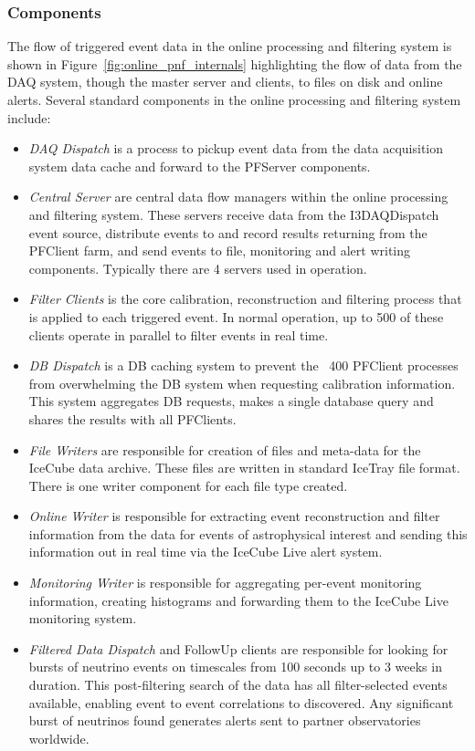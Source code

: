 \subsubsection{Components}
The flow of triggered event data in the online processing and filtering system is shown in Figure~\ref{fig:online_pnf_internals}
highlighting the flow of data from the DAQ system, though the master server and clients, to files on disk and
online alerts.  Several standard components in the online processing and filtering system include:
\begin{itemize}
\item \emph {DAQ Dispatch} is a process to pickup event data from the data acquisition system data cache and forward to
the PFServer components.
\item \emph {Central Server} are central data flow managers within the  online processing and filtering system.  These servers 
receive data from the I3DAQDispatch event source, distribute events to and record results returning from the PFClient farm,
and send events to file, monitoring and alert writing components.  Typically there are 4 servers used
in operation.
\item \emph {Filter Clients} is the core calibration, reconstruction and filtering process that is applied to each triggered event.  
In normal operation, up to 500 of these clients operate in parallel to filter events in real time.
\item \emph {DB Dispatch} is a DB caching system to prevent the ~400 PFClient processes from overwhelming the 
DB system when requesting calibration information.  This system aggregates DB requests, makes a single
database query and shares the results with all PFClients.
\item \emph {File Writers} are responsible for creation of files and meta-data for the IceCube data archive.  These
files are written in standard IceTray file format.  There is one writer component for each file type created.
\item \emph {Online Writer} is responsible for extracting event reconstruction and filter information from the data for events of astrophysical interest 
and sending this information out  in real time via the IceCube Live alert system.
\item \emph {Monitoring Writer} is responsible for aggregating per-event monitoring information, creating histograms
and forwarding them to the IceCube Live monitoring system.  
\item \emph {Filtered Data Dispatch} and FollowUp clients are responsible for looking for bursts of neutrino events on timescales from 100 seconds up to
3 weeks in duration. This post-filtering search of the data has all filter-selected events available, enabling event to event correlations to discovered.  Any 
significant burst of neutrinos found generates alerts sent to partner observatories worldwide.
\end{itemize}

